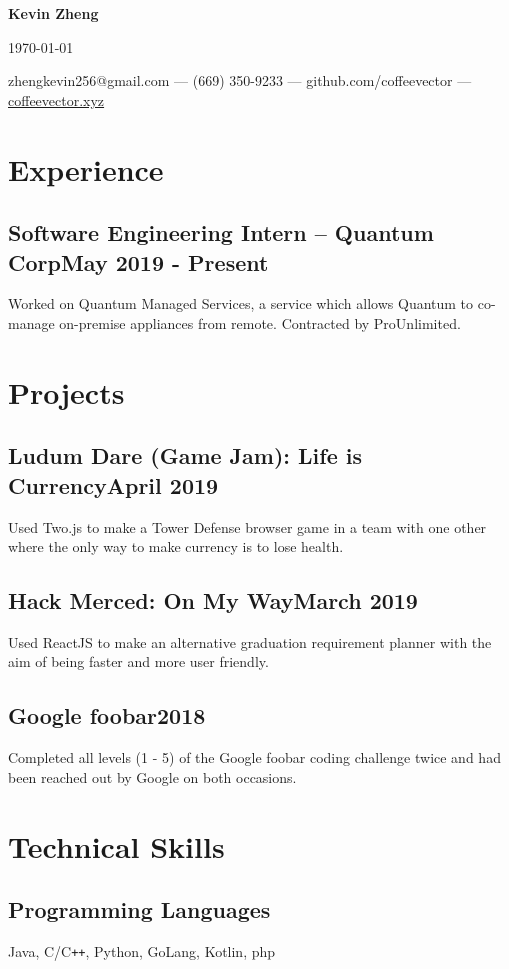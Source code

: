 \documentclass[letterpaper,12pt]{article}
\makeatletter
\newcommand\textbox[1]{%
    \parbox{.333\textwidth}{#1}%
}
\renewcommand{\maketitle}{
    \begin{center}
        \noindent\textbox{\hfill}\textbox{\hfil\bfseries\huge Kevin Zheng\hfil}\textbox{\hfill \today}
        {\faEnvelope \enskip zhengkevin256@gmail.com --- \faPhone \enskip (669) 350-9233 --- \faGithub \enskip github.com/coffeevector --- \faChain \enskip \underline{\color{blue}coffeevector.xyz}}
    \end{center} }
\makeatother
\begin{document}
\maketitle
\section{Experience}
    \subsection{Software Engineering Intern -- Quantum Corp\null\hfill May 2019 - Present}
    Worked on Quantum Managed Services, a service which allows Quantum to co-manage on-premise appliances from remote.
Contracted by ProUnlimited.
    \vspace*{-2mm}
\section{Projects}
    \subsection{Ludum Dare (Game Jam): Life is Currency\null\hfill April 2019}
    Used Two.js to make a Tower Defense browser game in a team with one other where the only way to make currency is to lose health.
    \vspace*{-2mm}
    \subsection{Hack Merced: On My Way\null\hfill March 2019}
    Used ReactJS to make an alternative graduation requirement planner with the aim of being faster and more user friendly.
    \vspace*{-2mm}
    \subsection{Google foobar\null\hfill 2018}
    Completed all levels (1 - 5) of the Google foobar coding challenge twice and had been reached out by Google on both occasions.
    \vspace*{-2mm}
\section{Technical Skills}
    \subsection{Programming Languages}
    Java, C/C\verb!++!, Python, GoLang, Kotlin, php
    \vspace*{-4mm}
\end{document}
